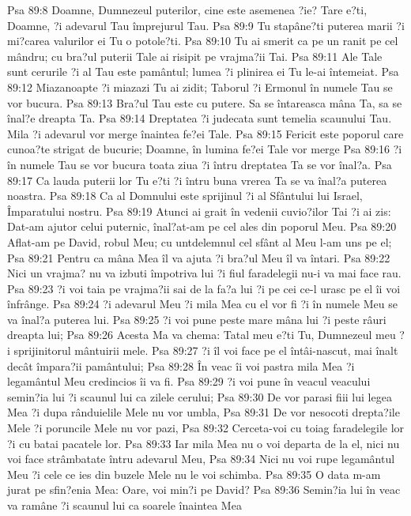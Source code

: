 Psa 89:8  Doamne, Dumnezeul puterilor, cine este asemenea ?ie? Tare e?ti, Doamne, ?i adevarul Tau împrejurul Tau.
Psa 89:9  Tu stapâne?ti puterea marii ?i mi?carea valurilor ei Tu o potole?ti.
Psa 89:10  Tu ai smerit ca pe un ranit pe cel mândru; cu bra?ul puterii Tale ai risipit pe vrajma?ii Tai.
Psa 89:11  Ale Tale sunt cerurile ?i al Tau este pamântul; lumea ?i plinirea ei Tu le-ai întemeiat.
Psa 89:12  Miazanoapte ?i miazazi Tu ai zidit; Taborul ?i Ermonul în numele Tau se vor bucura.
Psa 89:13  Bra?ul Tau este cu putere. Sa se întareasca mâna Ta, sa se înal?e dreapta Ta.
Psa 89:14  Dreptatea ?i judecata sunt temelia scaunului Tau. Mila ?i adevarul vor merge înaintea fe?ei Tale.
Psa 89:15  Fericit este poporul care cunoa?te strigat de bucurie; Doamne, în lumina fe?ei Tale vor merge
Psa 89:16  ?i în numele Tau se vor bucura toata ziua ?i întru dreptatea Ta se vor înal?a.
Psa 89:17  Ca lauda puterii lor Tu e?ti ?i întru buna vrerea Ta se va înal?a puterea noastra.
Psa 89:18  Ca al Domnului este sprijinul ?i al Sfântului lui Israel, Împaratului nostru.
Psa 89:19  Atunci ai grait în vedenii cuvio?ilor Tai ?i ai zis: Dat-am ajutor celui puternic, înal?at-am pe cel ales din poporul Meu.
Psa 89:20  Aflat-am pe David, robul Meu; cu untdelemnul cel sfânt al Meu l-am uns pe el;
Psa 89:21  Pentru ca mâna Mea îl va ajuta ?i bra?ul Meu îl va întari.
Psa 89:22  Nici un vrajma? nu va izbuti împotriva lui ?i fiul faradelegii nu-i va mai face rau.
Psa 89:23  ?i voi taia pe vrajma?ii sai de la fa?a lui ?i pe cei ce-l urasc pe el îi voi înfrânge.
Psa 89:24  ?i adevarul Meu ?i mila Mea cu el vor fi ?i în numele Meu se va înal?a puterea lui.
Psa 89:25  ?i voi pune peste mare mâna lui ?i peste râuri dreapta lui;
Psa 89:26  Acesta Ma va chema: Tatal meu e?ti Tu, Dumnezeul meu ?i sprijinitorul mântuirii mele.
Psa 89:27  ?i îl voi face pe el întâi-nascut, mai înalt decât împara?ii pamântului;
Psa 89:28  În veac îi voi pastra mila Mea ?i legamântul Meu credincios îi va fi.
Psa 89:29  ?i voi pune în veacul veacului semin?ia lui ?i scaunul lui ca zilele cerului;
Psa 89:30  De vor parasi fiii lui legea Mea ?i dupa rânduielile Mele nu vor umbla,
Psa 89:31  De vor nesocoti drepta?ile Mele ?i poruncile Mele nu vor pazi,
Psa 89:32  Cerceta-voi cu toiag faradelegile lor ?i cu batai pacatele lor.
Psa 89:33  Iar mila Mea nu o voi departa de la el, nici nu voi face strâmbatate întru adevarul Meu,
Psa 89:34  Nici nu voi rupe legamântul Meu ?i cele ce ies din buzele Mele nu le voi schimba.
Psa 89:35  O data m-am jurat pe sfin?enia Mea: Oare, voi min?i pe David?
Psa 89:36  Semin?ia lui în veac va ramâne ?i scaunul lui ca soarele înaintea Mea

